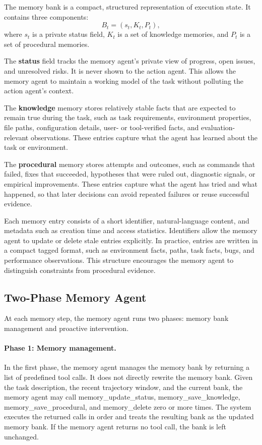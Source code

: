 The memory bank is a compact, structured representation of execution state. It
contains three components:
\[
B_t = (s_t, K_t, P_t),
\]
where $s_t$ is a private status field, $K_t$ is a set of knowledge memories, and
$P_t$ is a set of procedural memories.

The \textbf{status} field tracks the memory agent's private view of progress,
open issues, and unresolved risks. It is never shown to the action agent. This
allows the memory agent to maintain a working model of the task without
polluting the action agent's context.

The \textbf{knowledge} memory stores relatively stable facts that are expected
to remain true during the task, such as task requirements, environment
properties, file paths, configuration details, user- or tool-verified facts, and
evaluation-relevant observations. These entries capture what the agent has
learned about the task or environment.

The \textbf{procedural} memory stores attempts and outcomes, such as commands
that failed, fixes that succeeded, hypotheses that were ruled out, diagnostic
signals, or empirical improvements. These entries capture what the agent has
tried and what happened, so that later decisions can avoid repeated failures or
reuse successful evidence.

Each memory entry consists of a short identifier, natural-language content, and
metadata such as creation time and access statistics. Identifiers allow the
memory agent to update or delete stale entries explicitly. In practice, entries
are written in a compact tagged format, such as environment facts, paths, task
facts, bugs, and performance observations. This structure encourages the memory
agent to distinguish constraints from procedural evidence.


\subsection{Two-Phase Memory Agent}

At each memory step, the memory agent runs two phases: memory bank management
and proactive intervention.

\paragraph{Phase 1: Memory management.}
In the first phase, the memory agent manages the memory bank by returning a list
of predefined tool calls. It does not directly rewrite the memory bank. Given the
task description, the recent trajectory window, and the current bank, the memory
agent may call memory\_update\_status, memory\_save\_knowledge,
memory\_save\_procedural, and memory\_delete zero or more times. The system
executes the returned calls in order and treats the resulting bank as the updated
memory bank. If the memory agent returns no tool call, the bank is left
unchanged.

